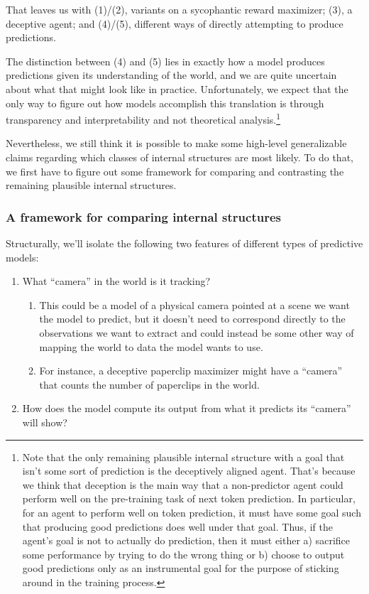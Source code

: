\documentclass[
  twocolumn,
  natbib,
]{miri-tech-article}
\begin{document}
That leaves us with (1)/(2), variants on a sycophantic\cite{why_ai_alignment_hard} reward maximizer; (3), a deceptive agent; and (4)/(5), different ways of directly attempting to produce predictions.

The distinction between (4) and (5) lies in exactly how a model produces predictions given its understanding of the world, and we are quite uncertain about what that might look like in practice. Unfortunately, we expect that the only way to figure out how models accomplish this translation is through transparency and interpretability and not theoretical analysis.\footnote{Note that the only remaining plausible internal structure with a goal that isn't some sort of prediction is the deceptively aligned agent. That's because we think that deception is the main way that a non-predictor agent could perform well on the pre-training task of next token prediction. In particular, for an agent to perform well on token prediction, it must have some goal such that producing good predictions does well under that goal. Thus, if the agent's goal is not to actually do prediction, then it must either a) sacrifice some performance by trying to do the wrong thing or b) choose to output good predictions only as an instrumental goal for the purpose of sticking around in the training process.}

Nevertheless, we still think it is possible to make some high-level generalizable claims regarding which classes of internal structures are most likely. To do that, we first have to figure out some framework for comparing and contrasting the remaining plausible internal structures.


\subsubsection{A framework for comparing internal structures}

Structurally, we'll isolate the following two features of different types of predictive models:



\begin{enumerate}
\item What ``camera'' in the world is it tracking?
    \begin{enumerate}
    \item This could be a model of a physical camera pointed at a scene we want the model to predict, but it doesn't need to correspond directly to the observations we want to extract and could instead be some other way of mapping the world to data the model wants to use.
    \item For instance, a deceptive paperclip maximizer might have a ``camera'' that counts the number of paperclips in the world.
    \end{enumerate}
\item How does the model compute its output from what it predicts its ``camera'' will show?
\end{enumerate}
\end{document}
